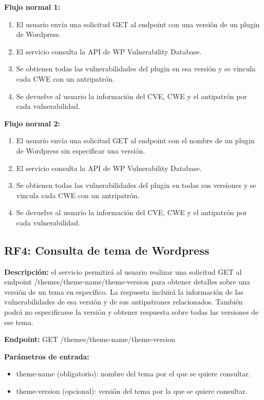 \textbf{Flujo normal 1:}

\begin{enumerate}
    \item El usuario envía una solicitud GET al endpoint con una versión de un plugin de Wordpress.
    \item El servicio consulta la API de WP Vulnerability Database.
    \item Se obtienen todas las vulnerabilidades del plugin en esa versión y se vincula cada CWE con un antripatrón.
    \item Se devuelve al usuario la información del CVE, CWE y el antipatrón por cada vulnerabilidad.
\end{enumerate}

\textbf{Flujo normal 2:}

\begin{enumerate}
    \item El usuario envía una solicitud GET al endpoint con el nombre de un plugin de Wordpress sin especificar una versión.
    \item El servicio consulta la API de WP Vulnerability Database.
    \item Se obtienen todas las vulnerabilidades del plugin en todas sus versiones y se vincula cada CWE con un antripatrón.
    \item Se devuelve al usuario la información del CVE, CWE y el antipatrón por cada vulnerabilidad.
\end{enumerate}

\subsection{RF4: Consulta de tema de Wordpress}

\textbf{Descripción:} el servicio permitirá al usuario realizar una solicitud GET al endpoint /themes/{theme-name}/{theme-version} para obtener detalles sobre una versión de un tema en específico. La respuesta incluirá la información de las vulnerabilidades de esa versión y de sus antipatrones relacionados.  También podrá no especificarse la versión y obtener respuesta sobre todas las versiones de ese tema.

\textbf{Endpoint:} GET /themes/{theme-name}/{theme-version}

\textbf{Parámetros de entrada: }

\begin{itemize}
    \item theme-name (obligatorio): nombre del tema por el que se quiere consultar.
    \item theme-version (opcional): versión del tema por la que se quiere consultar.
\end{itemize}

